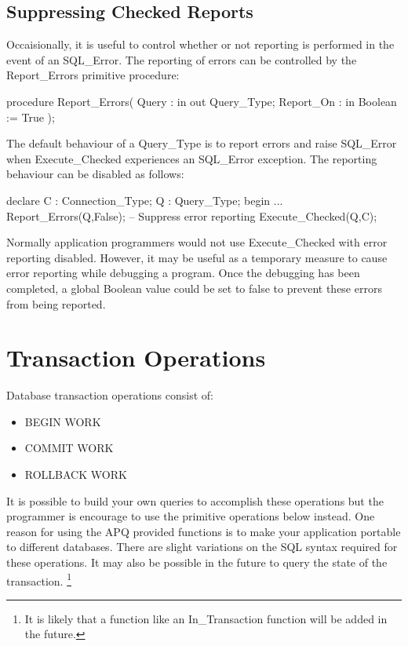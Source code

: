 \documentclass[english,letterpaper]{book}
\begin{document}
\subsection{Suppressing Checked Reports}

Occaisionally, it is useful to control whether or not reporting is
performed in the event of an SQL\_Error. The reporting of errors can
be controlled by the Report\_Errors primitive procedure:

\begin{Code}
procedure Report_Errors(
   Query :     in out Query_Type;
   Report_On : in     Boolean := True
);
\end{Code}

The default behaviour of a Query\_Type is to report errors and raise
SQL\_Error when Execute\_Checked experiences an SQL\_Error exception.
The reporting behaviour can be disabled as follows:

\begin{Example}
declare
   C :   Connection_Type;
   Q :   Query_Type;
begin
   ...
   Report_Errors(Q,False); -- Suppress error reporting
   Execute_Checked(Q,C);
\end{Example}

Normally application programmers would not use Execute\_Checked with
error reporting disabled. However, it may be useful as a temporary
measure to cause error reporting while debugging a program. Once the
debugging has been completed, a global Boolean value could be set
to false to prevent these errors from being reported.


\section{Transaction Operations}

Database transaction operations consist of:

\begin{itemize}
   \item BEGIN WORK
   \item COMMIT WORK
   \item ROLLBACK WORK
\end{itemize}

It is possible to build your own queries to accomplish these operations
but the programmer is encourage to use the primitive operations below
instead. One reason for using the APQ provided functions is to make
your application portable to different databases. There are slight
variations on the SQL syntax required for these operations. It may
also be possible in the future to query the state of the transaction.%
\footnote{It is likely that a function like an In\_Transaction function will
be added in the future.%
}
\end{document}
